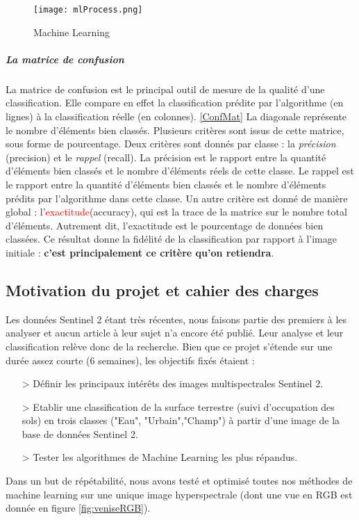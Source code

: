 \begin{figure}[H]
  \centering
    \texttt{[image: mlProcess.png]}
  \caption{Machine Learning}
  \label{fig:ml}
\end{figure}

\subparagraph{La matrice de confusion}
\paragraph{}
La matrice de confusion est le principal outil de mesure de la qualité d'une classification. Elle compare en effet la classification prédite par l'algorithme (en lignes) à la classification réelle (en colonnes). \ref{ConfMat}
La diagonale représente le nombre d'éléments bien classés. \newline
Plusieurs critères sont issus de cette matrice, sous forme de pourcentage. Deux critères sont donnés par classe : la \textit{précision} (precision) et le \textit{rappel} (recall). La précision est le rapport entre la quantité d'éléments bien classés et le nombre d'éléments réels de cette classe. Le rappel est le rapport entre la quantité d'éléments bien classés et le nombre d'éléments prédits par l'algorithme dans cette classe.\newline
Un autre critère est donné de manière global : l'\textcolor{red}{exactitude}(accuracy), qui est la trace de la matrice sur le nombre total d'éléments. Autrement dit, l'exactitude est le pourcentage de données bien classées. Ce résultat donne la fidélité de la classification par rapport à l'image initiale : \textbf{c'est principalement ce critère qu'on retiendra}.




\subsection{Motivation du projet et cahier des charges}

Les données Sentinel 2 étant très récentes, nous faisons partie des premiers à les analyser et aucun article à leur sujet n'a encore été publié. Leur analyse et leur classification relève donc de la recherche. 
Bien que ce projet s'étende sur une durée assez courte (6 semaines), les objectifs fixés étaient :
\begin{itemize}
  \item[>] Définir les principaux intérêts des images multispectrales Sentinel 2.
  \item[>] Etablir une classification de la surface terrestre (suivi d'occupation des sols) en trois classes ("Eau", "Urbain","Champ") à partir d'une image de la base de données Sentinel 2.
  \item[>] Tester les algorithmes de Machine Learning les plus répandus.
\end{itemize}

  Dans un but de répétabilité, nous avons testé et optimisé toutes nos méthodes de machine learning sur une unique image hyperspectrale (dont une vue en RGB est donnée en figure \ref{fig:veniseRGB}).
 
